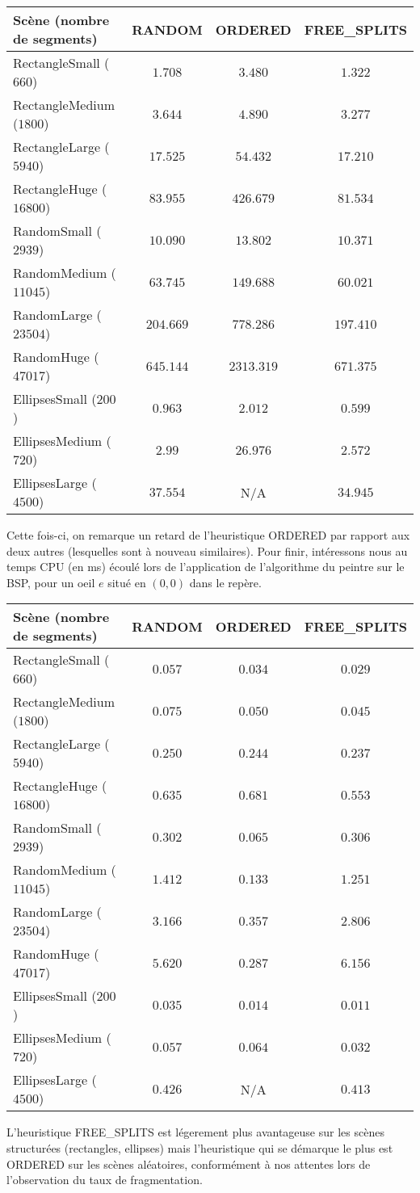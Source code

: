 \documentclass[11pts]{article}
\begin{document}
\begin{longtable}{|l|c|c|c|}
\hline
\textbf{Scène (nombre de segments)} & \textbf{RANDOM} & \textbf{ORDERED} & \textbf{FREE\_SPLITS}\\
\hline
RectangleSmall ($660$)&$1.708$&$3.480$&$1.322$\\
\hline
RectangleMedium ($1800$)&$3.644$&$4.890$&$3.277$\\
\hline
RectangleLarge ($5940$)&$17.525$&$54.432$&$17.210$\\
\hline
RectangleHuge ($16800$)&$83.955$&$426.679$&$81.534$\\
\hline
RandomSmall ($2939$)&$10.090$&$13.802$&$10.371$\\
\hline
RandomMedium ($11045$)&$63.745$&$149.688$&$60.021$\\
\hline
RandomLarge ($23504$)&$204.669$&$778.286$&$197.410$\\
\hline
RandomHuge ($47017$)&$645.144$&$2313.319$&$671.375$\\
\hline
EllipsesSmall ($200$)&$0.963$&$2.012$&$0.599$\\
\hline
EllipsesMedium ($720$)&$2.99$&$26.976$&$2.572$\\
\hline
EllipsesLarge ($4500$)&$37.554$&N/A&$34.945$\\
\hline
\end{longtable}
\noindent Cette fois-ci, on remarque un retard de l'heuristique ORDERED par rapport aux deux autres (lesquelles sont à nouveau similaires).
\newpage
\noindent Pour finir, intéressons nous au temps CPU (en ms) écoulé lors de l'application de l'algorithme du peintre sur le BSP, pour un oeil $e$ situé en $(0,0)$ dans le repère.
\begin{longtable}{|l|c|c|c|}
\hline
\textbf{Scène (nombre de segments)} & \textbf{RANDOM} & \textbf{ORDERED} & \textbf{FREE\_SPLITS}\\
\hline
RectangleSmall ($660$)&$0.057$&$0.034$&$0.029$\\
\hline
RectangleMedium ($1800$)&$0.075$&$0.050$&$0.045$\\
\hline
RectangleLarge ($5940$)&$0.250$&$0.244$&$0.237$\\
\hline
RectangleHuge ($16800$)&$0.635$&$0.681$&$0.553$\\
\hline
RandomSmall ($2939$)&$0.302$&$0.065$&$0.306$\\
\hline
RandomMedium ($11045$)&$1.412$&$0.133$&$1.251$\\
\hline
RandomLarge ($23504$)&$3.166$&$0.357$&$2.806$\\
\hline
RandomHuge ($47017$)&$5.620$&$0.287$&$6.156$\\
\hline
EllipsesSmall ($200$)&$0.035$&$0.014$&$0.011$\\
\hline
EllipsesMedium ($720$)&$0.057$&$0.064$&$0.032$\\
\hline
EllipsesLarge ($4500$)&$0.426$&N/A&$0.413$\\
\hline
\end{longtable}
\noindent L'heuristique FREE\_SPLITS est légerement plus avantageuse sur les scènes structurées (rectangles, ellipses) mais l'heuristique qui se démarque le plus est ORDERED sur les scènes aléatoires, conformément à nos attentes lors de l'observation du taux de fragmentation.
\end{document}

